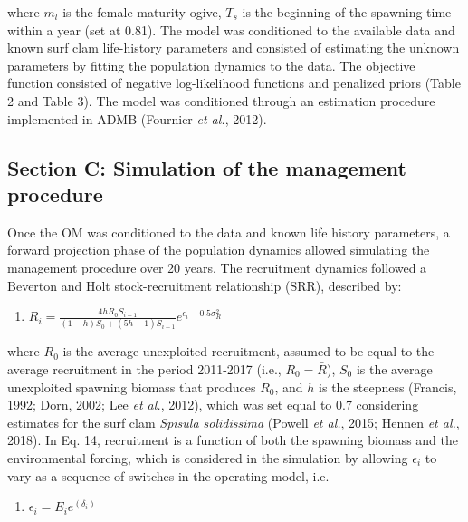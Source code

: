\documentclass[12pt]{article}
\providecommand{\tightlist}{%
  \setlength{\itemsep}{0pt}\setlength{\parskip}{0pt}}
\begin{document}
where \(m_l\) is the female maturity ogive, \(T_s\) is the beginning of
the spawning time within a year (set at 0.81). The model was conditioned
to the available data and known surf clam life-history parameters and
consisted of estimating the unknown parameters by fitting the population
dynamics to the data. The objective function consisted of negative
log-likelihood functions and penalized priors (Table 2 and Table 3). The
model was conditioned through an estimation procedure implemented in
ADMB (Fournier \emph{et al.}, 2012).

\hypertarget{section-c-simulation-of-the-management-procedure}{%
\subsection{Section C: Simulation of the management
procedure}\label{section-c-simulation-of-the-management-procedure}}

Once the OM was conditioned to the data and known life history
parameters, a forward projection phase of the population dynamics
allowed simulating the management procedure over 20 years. The
recruitment dynamics followed a Beverton and Holt stock-recruitment
relationship (SRR), described by:

\begin{enumerate}
\def\labelenumi{\arabic{enumi})}
\setcounter{enumi}{13}
\tightlist
\item
  \(R_i=\frac{4 h R_0 S_{i-1}}{(1-h) S_0+(5h-1) S_{i-1}} e^{\epsilon_i - 0.5\sigma_R^2}\)
\end{enumerate}

where \(R_0\) is the average unexploited recruitment, assumed to be
equal to the average recruitment in the period 2011-2017 (i.e.,
\(R_0=\bar{R}\)), \(S_0\) is the average unexploited spawning biomass
that produces \(R_0\), and \(h\) is the steepness (Francis, 1992; Dorn,
2002; Lee \emph{et al.}, 2012), which was set equal to 0.7 considering
estimates for the surf clam \emph{Spisula solidissima} (Powell \emph{et
al.}, 2015; Hennen \emph{et al.}, 2018). In Eq. 14, recruitment is a
function of both the spawning biomass and the environmental forcing,
which is considered in the simulation by allowing \(\epsilon_i\) to vary
as a sequence of switches in the operating model, i.e.

\begin{enumerate}
\def\labelenumi{\arabic{enumi})}
\setcounter{enumi}{14}
\tightlist
\item
  \(\epsilon_i=E_i e^{(\delta_i)}\)
\end{enumerate}
\end{document}
